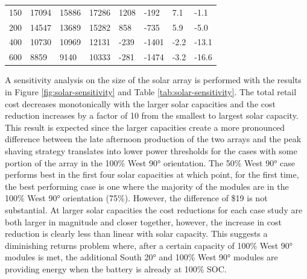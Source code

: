 \documentclass[journal,article,submit,pdftex,moreauthors]{Definitions/mdpi}
\begin{document}
\begin{table}[!h]
\begin{tabularx}{\textwidth}{XXXXXXXX}
    150             & 17094                 & 15886                     & 17286                      & 1208                                & -192                                 & 7.1                                 & -1.1                                 \\
    200             & 14547                 & 13689                     & 15282                      & 858                                 & -735                                 & 5.9                                 & -5.0                                 \\
    400             & 10730                 & 10969                     & 12131                      & -239                                & -1401                                & -2.2                                & -13.1                                \\
    600             & 8859                  & 9140                      & 10333                      & -281                                & -1474                                & -3.2                                & -16.6                                \\
    \bottomrule
  \end{tabularx}
\end{table}

A sensitivity analysis on the size of the solar array is performed with the results in Figure \ref{fig:solar-sensitivity} and Table \ref{tab:solar-sensitivity}. The total retail cost decreases monotonically with the larger solar capacities and the cost reduction increases by a factor of 10 from the smallest to largest solar capacity. This result is expected since the larger capacities create a more pronounced difference between the late afternoon production of the two arrays and the peak shaving strategy translates into lower power thresholds for the cases with some portion of the array in the 100\% West 90° orientation. The 50\% West 90° case performs best in the first four solar capacities at which point, for the first time, the best performing case is one where the majority of the modules are in the 100\% West 90° orientation (75\%). However, the difference of \$19 is not substantial. At larger solar capacities the cost reductions for each case study are both larger in magnitude and closer together, however, the increase in cost reduction is clearly less than linear with solar capacity. This suggests a diminishing returns problem where, after a certain capacity of 100\% West 90° modules is met, the additional South 20° and 100\% West 90° modules are providing energy when the battery is already at 100\% SOC.
\end{document}
